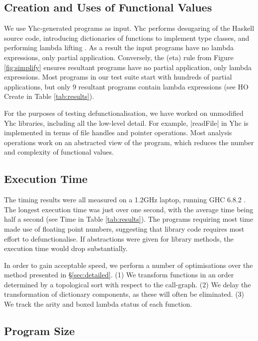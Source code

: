 \documentclass{sigplanconf}
\begin{document}
\subsection{Creation and Uses of Functional Values}

We use Yhc-generated programs as input. Yhc performs desugaring of the Haskell source code, introducing dictionaries of functions to implement type classes, and performing lambda lifting \cite{lambda_lift}. As a result the input programs have no lambda expressions, only partial application. Conversely, the (eta) rule from Figure \ref{fig:simplify} ensures resultant programs have no partial application, only lambda expressions. Most programs in our test suite start with hundreds of partial applications, but only 9 resultant programs contain lambda expressions (see HO Create in Table \ref{tab:results}).

For the purposes of testing defunctionalisation, we have worked on unmodified Yhc libraries, including all the low-level detail. For example, |readFile| in Yhc is implemented in terms of file handles and pointer operations. Most analysis operations work on an abstracted view of the program, which reduces the number and complexity of functional values.

\subsection{Execution Time}
\label{sec:time}

The timing results were all measured on a 1.2GHz laptop, running GHC 6.8.2 \cite{ghc}. The longest execution time was just over one second, with the average time being half a second (see Time in Table \ref{tab:results}). The programs requiring most time made use of floating point numbers, suggesting that library code requires most effort to defunctionalise. If abstractions were given for library methods, the execution time would drop substantially.

In order to gain acceptable speed, we perform a number of optimisations over the method presented in \S\ref{sec:detailed}. (1) We transform functions in an order determined by a topological sort with respect to the call-graph. (2) We delay the transformation of dictionary components, as these will often be eliminated. (3) We track the arity and boxed lambda status of each function.

\subsection{Program Size}
\end{document}
